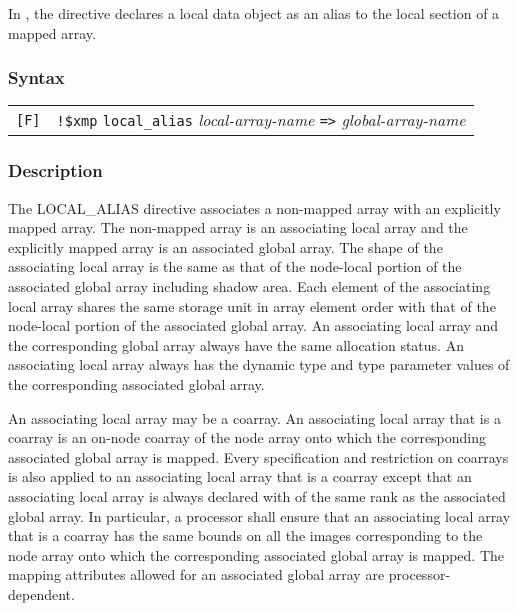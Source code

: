 In {\XMPF}, the {\tt {}} directive declares a
local data object as an alias to the local section of a mapped
array.

\subsubsection*{Syntax}

\begin{tabular}{ll}
\verb![F]! & \verb|!$xmp| {\tt local\_alias} {\it local-array-name}
\verb|=>| {\it global-array-name} \\
\end{tabular}

\subsubsection*{Description}

The LOCAL\_ALIAS directive associates a non-mapped array with
an explicitly mapped array.
The non-mapped array is an associating local array and
the explicitly mapped array is an associated global array.
The shape of the associating local array is the same as
that of the node-local portion of the associated global array
including shadow area.
Each element of the associating local array shares the 
same storage unit in array element order with that of the node-local portion 
of the associated global array.
An associating local array and the corresponding global array always have
the same allocation status.
An associating local array always has the dynamic type
and type parameter values of the corresponding 
associated global array.



An associating local array may be a coarray.
An associating local array that is a coarray is
an on-node coarray of the node array onto which the corresponding
associated global array is mapped.
Every specification and restriction on coarrays is also applied to an associating local
array that is a coarray except that
an associating local array is always declared with
 of the same rank as the associated global array.
In particular, a processor shall ensure that an associating local array 
that is a coarray has
the same bounds on all the images corresponding to the node array
onto which the corresponding associated global array is mapped.
The mapping attributes allowed for an associated global array are
processor-dependent.

